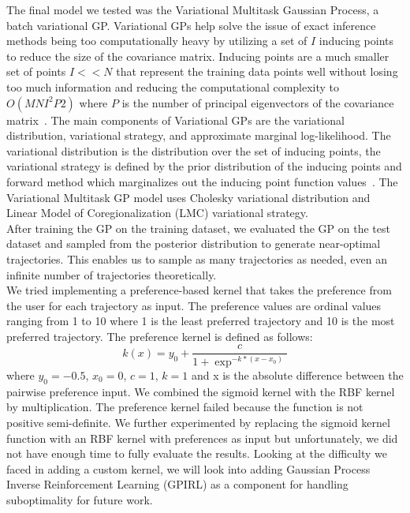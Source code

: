 The final model we tested was the Variational Multitask Gaussian Process, a batch variational GP. Variational GPs help solve the issue of exact inference methods being too computationally heavy by utilizing a set of $I$ inducing points to reduce the size of the covariance matrix. Inducing points are a much smaller set of points $I << N$ that represent the training data points well without losing too much information and reducing the computational complexity to $O(MNI^2P2)$ where $P$ is the number of principal eigenvectors of the covariance matrix~\cite{Bonilla07neurips}.
The main components of Variational GPs are the variational distribution, variational strategy, and approximate marginal log-likelihood. The variational distribution is the distribution over the set of inducing points, the variational strategy is defined by the prior distribution of the inducing points and forward method which marginalizes out the inducing point function values~\cite{Gardner18neurips}. The Variational Multitask GP model uses Cholesky variational distribution and Linear Model of Coregionalization (LMC) variational strategy. \\

After training the GP on the training dataset, we evaluated the GP on the test dataset and sampled from the posterior distribution to generate near-optimal trajectories. This enables us to sample as many trajectories as needed, even an infinite number of trajectories theoretically. \\
   
We tried implementing a preference-based kernel that takes the preference from the user for each trajectory as input. The preference values are ordinal values ranging from 1 to 10 where 1 is the least preferred trajectory and 10 is the most preferred trajectory. The preference kernel is defined as follows:
   \[k(x) = y_{0} + \frac{c}{1+\exp^{-k*(x-x_{0})}}\]
   where $y_{0} = -0.5$, $x_{0} = 0$, $c = 1$, $k = 1$ and x is the absolute difference between the pairwise preference input. We combined the sigmoid kernel with the RBF kernel by multiplication. The preference kernel failed because the function is not positive semi-definite. We further experimented by replacing the sigmoid kernel function with an RBF kernel with preferences as input but unfortunately, we did not have enough time to fully evaluate the results. Looking at the difficulty we faced in adding a custom kernel, we will look into adding Gaussian Process Inverse Reinforcement Learning (GPIRL) \cite{Levine11neurips} as a component for handling suboptimality for future work. 

